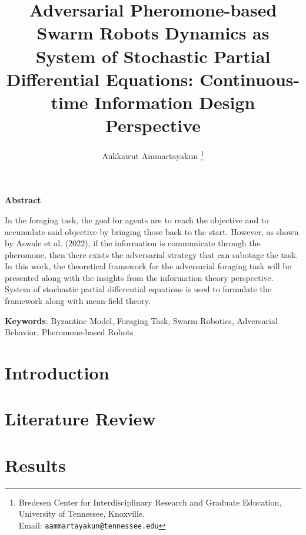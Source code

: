 \documentclass[12pt]{article}
\begin{document}
\title{Adversarial Pheromone-based Swarm Robots Dynamics as System of Stochastic Partial Differential Equations: Continuous-time Information Design Perspective}  

\author{
Aukkawut Ammartayakun   \thanks{Bredesen Center for Interdisciplinary Research and Graduate Education, University of Tennessee, Knoxville.  \\Email: {\tt aammartayakun@tennessee.edu}}  
}

\maketitle

\begin{center}
\textbf{Abstract}
\end{center}

In the foraging task, the goal for agents are to reach the objective and to accumulate said objective by bringing those back to the start. However, as shown by Aswale et al. (2022), if the information is communicate through the pheromone, then there exists the adversarial strategy that can sabotage the task. In this work, the theoretical framework for the adversarial foraging task will be presented along with the insights from the information theory perspective. System of stochastic partial differential equations is used to formulate the framework along with mean-field theory. 

\noindent
\textbf{Keywords}: Byzantine Model, Foraging Task, Swarm Robotics, Adversarial Behavior, Pheromone-based Robots

\thispagestyle{empty}

\newpage


\section{Introduction}\label{intro}

\section{Literature Review}
\section{Results}
\end{document}

